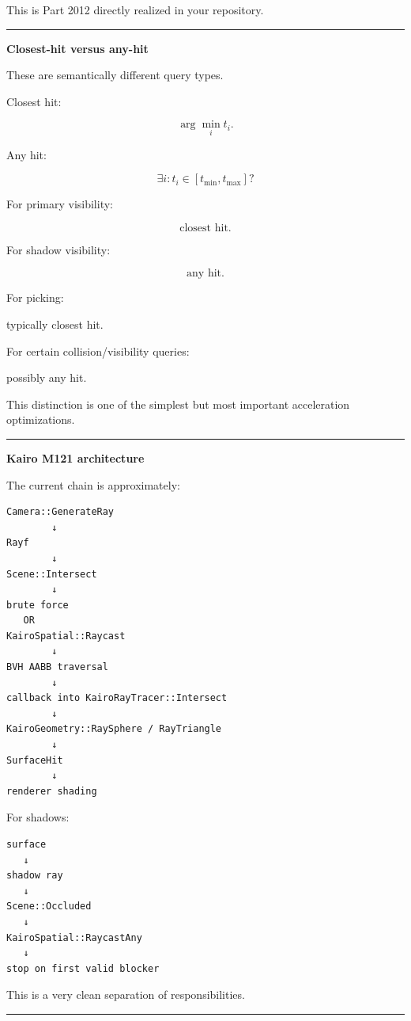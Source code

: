 This is Part 2012 directly realized in your repository.

\begin{center}\rule{0.5\linewidth}{0.5pt}\end{center}

\textbf{Closest-hit versus any-hit}

These are semantically different query types.

Closest hit:

\[
\boxed{
\arg\min_{i}
t_i.
}
\]

Any hit:

\[
\boxed{
\exists i:t_i\in[t_{\min},t_{\max}]?
}
\]

For primary visibility:

\[
\text{closest hit}.
\]

For shadow visibility:

\[
\text{any hit}.
\]

For picking:

typically closest hit.

For certain collision/visibility queries:

possibly any hit.

This distinction is one of the simplest but most important acceleration optimizations.

\begin{center}\rule{0.5\linewidth}{0.5pt}\end{center}

\textbf{Kairo M121 architecture}

The current chain is approximately:

\begin{verbatim}
Camera::GenerateRay
        ↓
Rayf
        ↓
Scene::Intersect
        ↓
brute force
   OR
KairoSpatial::Raycast
        ↓
BVH AABB traversal
        ↓
callback into KairoRayTracer::Intersect
        ↓
KairoGeometry::RaySphere / RayTriangle
        ↓
SurfaceHit
        ↓
renderer shading
\end{verbatim}

For shadows:

\begin{verbatim}
surface
   ↓
shadow ray
   ↓
Scene::Occluded
   ↓
KairoSpatial::RaycastAny
   ↓
stop on first valid blocker
\end{verbatim}

This is a very clean separation of responsibilities.

\begin{center}\rule{0.5\linewidth}{0.5pt}\end{center}

